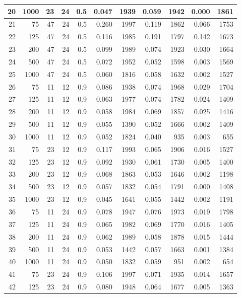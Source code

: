 \documentclass{article}
\begin{document}
\begin{tabular}{rrrrrrrrrrr}
  20 & 1000 & 23 & 24 & 0.5 & 0.047 & 1939 & 0.059 & 1942 & 0.000 & 1861 \\ 
   \hline
21 & 75 & 47 & 24 & 0.5 & 0.260 & 1997 & 0.119 & 1862 & 0.066 & 1753 \\ 
  22 & 125 & 47 & 24 & 0.5 & 0.116 & 1985 & 0.191 & 1797 & 0.142 & 1673 \\ 
  23 & 200 & 47 & 24 & 0.5 & 0.099 & 1989 & 0.074 & 1923 & 0.030 & 1664 \\ 
  24 & 500 & 47 & 24 & 0.5 & 0.072 & 1952 & 0.052 & 1598 & 0.003 & 1569 \\ 
  25 & 1000 & 47 & 24 & 0.5 & 0.060 & 1816 & 0.058 & 1632 & 0.002 & 1527 \\ 
   \hline
26 & 75 & 11 & 12 & 0.9 & 0.086 & 1938 & 0.074 & 1968 & 0.029 & 1704 \\ 
  27 & 125 & 11 & 12 & 0.9 & 0.063 & 1977 & 0.074 & 1782 & 0.024 & 1409 \\ 
  28 & 200 & 11 & 12 & 0.9 & 0.058 & 1984 & 0.069 & 1857 & 0.025 & 1416 \\ 
  29 & 500 & 11 & 12 & 0.9 & 0.055 & 1390 & 0.052 & 1666 & 0.002 & 1409 \\ 
  30 & 1000 & 11 & 12 & 0.9 & 0.052 & 1824 & 0.040 & 935 & 0.003 & 655 \\ 
   \hline
31 & 75 & 23 & 12 & 0.9 & 0.117 & 1993 & 0.065 & 1906 & 0.016 & 1527 \\ 
  32 & 125 & 23 & 12 & 0.9 & 0.092 & 1930 & 0.061 & 1730 & 0.005 & 1400 \\ 
  33 & 200 & 23 & 12 & 0.9 & 0.068 & 1863 & 0.053 & 1646 & 0.002 & 1198 \\ 
  34 & 500 & 23 & 12 & 0.9 & 0.057 & 1832 & 0.054 & 1791 & 0.000 & 1408 \\ 
  35 & 1000 & 23 & 12 & 0.9 & 0.045 & 1641 & 0.055 & 1442 & 0.002 & 1191 \\ 
   \hline
36 & 75 & 11 & 24 & 0.9 & 0.078 & 1947 & 0.076 & 1973 & 0.019 & 1798 \\ 
  37 & 125 & 11 & 24 & 0.9 & 0.065 & 1982 & 0.069 & 1770 & 0.016 & 1405 \\ 
  38 & 200 & 11 & 24 & 0.9 & 0.062 & 1989 & 0.058 & 1878 & 0.015 & 1444 \\ 
  39 & 500 & 11 & 24 & 0.9 & 0.053 & 1442 & 0.057 & 1663 & 0.001 & 1384 \\ 
  40 & 1000 & 11 & 24 & 0.9 & 0.050 & 1832 & 0.059 & 951 & 0.002 & 654 \\ 
   \hline
41 & 75 & 23 & 24 & 0.9 & 0.106 & 1997 & 0.071 & 1935 & 0.014 & 1657 \\ 
  42 & 125 & 23 & 24 & 0.9 & 0.080 & 1948 & 0.064 & 1677 & 0.005 & 1363 \\ 

\end{tabular}
\end{document}
